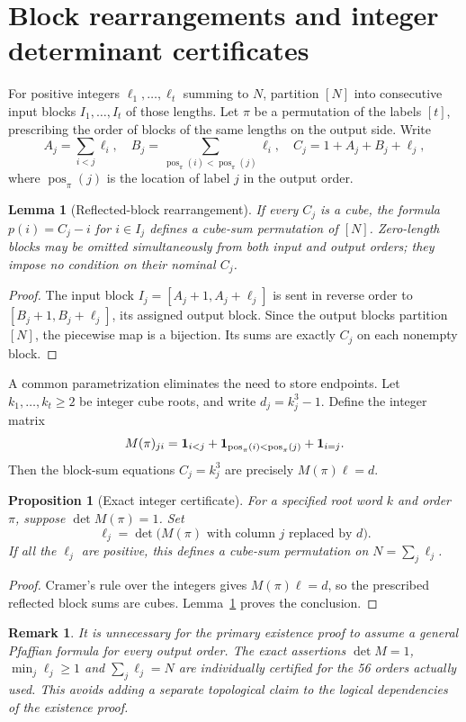 \documentclass[9pt]{extarticle}
\newtheorem{lemma}[theorem]{Lemma}
\newtheorem{proposition}[theorem]{Proposition}
\newtheorem{remark}[theorem]{Remark}
\newcommand{\pp}{\operatorname{pos}}
\begin{document}
\section{Block rearrangements and integer determinant certificates}\label{sec:blocks}
For positive integers $\ell_1,\ldots,\ell_t$ summing to $N$, partition $[N]$ into consecutive input blocks $I_1,\ldots,I_t$ of those lengths. Let $\pi$ be a permutation of the labels $[t]$, prescribing the order of blocks of the same lengths on the output side. Write
\[
 A_j=\sum_{i<j}\ell_i,\quad B_j=\sum_{\pp_\pi(i)<\pp_\pi(j)}\ell_i,
 \quad C_j=1+A_j+B_j+\ell_j,
\]
where $\pp_\pi(j)$ is the location of label $j$ in the output order.
\begin{lemma}[Reflected-block rearrangement]\label{lem:blocks}
If every $C_j$ is a cube, the formula $p(i)=C_j-i$ for $i\in I_j$ defines a cube-sum permutation of $[N]$. Zero-length blocks may be omitted simultaneously from both input and output orders; they impose no condition on their nominal $C_j$.
\end{lemma}
\begin{proof}
The input block $I_j=[A_j+1,A_j+\ell_j]$ is sent in reverse order to $[B_j+1,B_j+\ell_j]$, its assigned output block. Since the output blocks partition $[N]$, the piecewise map is a bijection. Its sums are exactly $C_j$ on each nonempty block.
\end{proof}

A common parametrization eliminates the need to store endpoints. Let $k_1,\ldots,k_t\ge2$ be integer cube roots, and write $d_j=k_j^3-1$. Define the integer matrix
\begin{equation}\label{eq:matrix}
 M(\pi)_{ji}={\bf1}_{i<j}+{\bf1}_{\pp_\pi(i)<\pp_\pi(j)}+{\bf1}_{i=j}.
\end{equation}
Then the block-sum equations $C_j=k_j^3$ are precisely $M(\pi)\ell=d$.
\begin{proposition}[Exact integer certificate]\label{prop:det}
For a specified root word $k$ and order $\pi$, suppose $\det M(\pi)=1$. Set
\begin{equation}\label{eq:cramer}
 \ell_j=\det\bigl(M(\pi)\text{ with column }j\text{ replaced by }d\bigr).
\end{equation}
If all the $\ell_j$ are positive, this defines a cube-sum permutation on $N=\sum_j\ell_j$.
\end{proposition}
\begin{proof}
Cramer's rule over the integers gives $M(\pi)\ell=d$, so the prescribed reflected block sums are cubes. Lemma~\ref{lem:blocks} proves the conclusion.
\end{proof}
\begin{remark}
It is unnecessary for the primary existence proof to assume a general Pfaffian formula for \emph{every} output order. The exact assertions $\det M=1$, $\min_j\ell_j\ge1$ and $\sum_j\ell_j=N$ are individually certified for the 56 orders actually used. This avoids adding a separate topological claim to the logical dependencies of the existence proof.
\end{remark}
\end{document}
